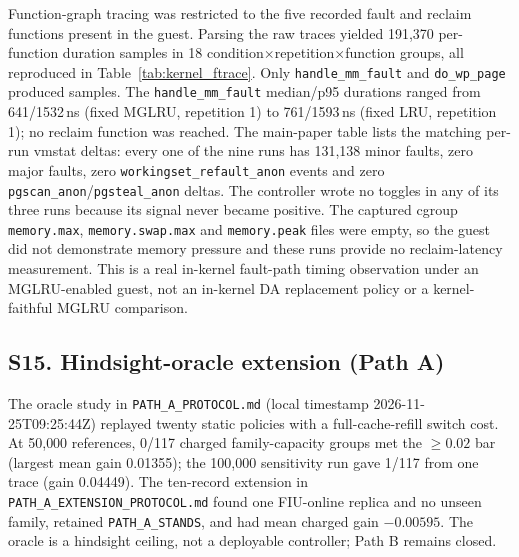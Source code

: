 \documentclass[journal,onecolumn]{IEEEtran}
\begin{document}
Function-graph tracing was restricted to the five recorded fault and
reclaim functions present in the guest. Parsing the raw traces yielded 191,370
per-function duration samples in 18 condition$\times$repetition$\times$function
groups, all reproduced in Table~\ref{tab:kernel_ftrace}. Only
\texttt{handle\_mm\_fault} and \texttt{do\_wp\_page} produced samples. The
\texttt{handle\_mm\_fault} median/p95 durations ranged from 641/1532\,ns
(fixed MGLRU, repetition 1) to 761/1593\,ns (fixed LRU, repetition 1); no
reclaim function was reached. The main-paper table lists the matching per-run
vmstat deltas: every one of the nine runs has
131,138 minor faults, zero major faults, zero \texttt{workingset\_refault\_anon}
events and zero \texttt{pgscan\_anon}/\texttt{pgsteal\_anon} deltas. The
controller wrote no toggles in any of its three runs because its signal never
became positive. The captured cgroup \texttt{memory.max}, \texttt{memory.swap.max}
and \texttt{memory.peak} files were empty, so the guest did not demonstrate
memory pressure and these runs provide no reclaim-latency measurement. This is
a real in-kernel fault-path timing observation under an MGLRU-enabled guest,
not an in-kernel DA replacement policy or a kernel-faithful MGLRU comparison.



\subsection{S15. Hindsight-oracle extension (Path A)}
The oracle study in \texttt{PATH\_A\_PROTOCOL.md} (local timestamp
2026-11-25T09:25:44Z) replayed twenty static policies with a full-cache-refill
switch cost. At 50{,}000 references, 0/117 charged family-capacity groups met
the $\ge 0.02$ bar (largest mean gain 0.01355); the 100{,}000 sensitivity run
gave 1/117 from one trace (gain 0.04449). The ten-record extension in
\texttt{PATH\_A\_EXTENSION\_PROTOCOL.md} found one FIU-online replica and no unseen
family, retained \texttt{PATH\_A\_STANDS}, and had mean charged gain $-0.00595$.
The oracle is a hindsight ceiling, not a deployable controller; Path B remains
closed.
\end{document}
